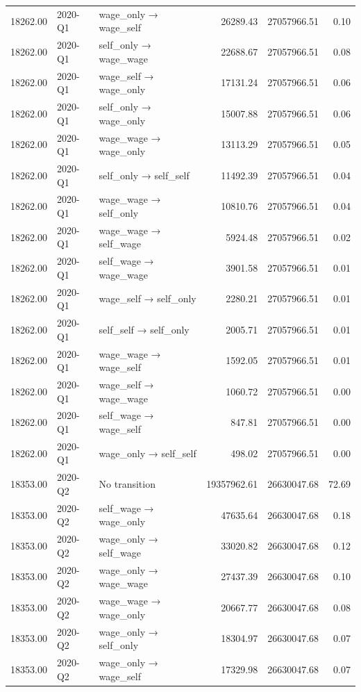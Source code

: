 \begin{table}[ht]
{\begin{tabular}{rllrrr}
  18262.00 & 2020-Q1 & wage\_only → wage\_self & 26289.43 & 27057966.51 & 0.10 \\ 
  18262.00 & 2020-Q1 & self\_only → wage\_wage & 22688.67 & 27057966.51 & 0.08 \\ 
  18262.00 & 2020-Q1 & wage\_self → wage\_only & 17131.24 & 27057966.51 & 0.06 \\ 
  18262.00 & 2020-Q1 & self\_only → wage\_only & 15007.88 & 27057966.51 & 0.06 \\ 
  18262.00 & 2020-Q1 & wage\_wage → wage\_only & 13113.29 & 27057966.51 & 0.05 \\ 
  18262.00 & 2020-Q1 & self\_only → self\_self & 11492.39 & 27057966.51 & 0.04 \\ 
  18262.00 & 2020-Q1 & wage\_wage → self\_only & 10810.76 & 27057966.51 & 0.04 \\ 
  18262.00 & 2020-Q1 & wage\_wage → self\_wage & 5924.48 & 27057966.51 & 0.02 \\ 
  18262.00 & 2020-Q1 & self\_wage → wage\_wage & 3901.58 & 27057966.51 & 0.01 \\ 
  18262.00 & 2020-Q1 & wage\_self → self\_only & 2280.21 & 27057966.51 & 0.01 \\ 
  18262.00 & 2020-Q1 & self\_self → self\_only & 2005.71 & 27057966.51 & 0.01 \\ 
  18262.00 & 2020-Q1 & wage\_wage → wage\_self & 1592.05 & 27057966.51 & 0.01 \\ 
  18262.00 & 2020-Q1 & wage\_self → wage\_wage & 1060.72 & 27057966.51 & 0.00 \\ 
  18262.00 & 2020-Q1 & self\_wage → wage\_self & 847.81 & 27057966.51 & 0.00 \\ 
  18262.00 & 2020-Q1 & wage\_only → self\_self & 498.02 & 27057966.51 & 0.00 \\ 
  18353.00 & 2020-Q2 & No transition & 19357962.61 & 26630047.68 & 72.69 \\ 
  18353.00 & 2020-Q2 & self\_wage → wage\_only & 47635.64 & 26630047.68 & 0.18 \\ 
  18353.00 & 2020-Q2 & wage\_only → self\_wage & 33020.82 & 26630047.68 & 0.12 \\ 
  18353.00 & 2020-Q2 & wage\_only → wage\_wage & 27437.39 & 26630047.68 & 0.10 \\ 
  18353.00 & 2020-Q2 & wage\_wage → wage\_only & 20667.77 & 26630047.68 & 0.08 \\ 
  18353.00 & 2020-Q2 & wage\_only → self\_only & 18304.97 & 26630047.68 & 0.07 \\ 
  18353.00 & 2020-Q2 & wage\_only → wage\_self & 17329.98 & 26630047.68 & 0.07 \\ 

\end{tabular}}
\end{table}
